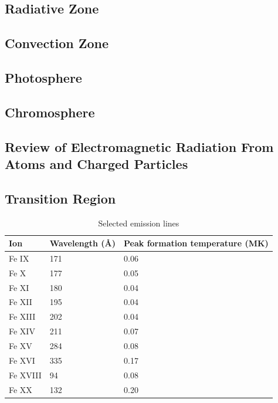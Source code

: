\subsection{Radiative Zone}

\subsection{Convection Zone}

\subsection{Photosphere}

\subsection{Chromosphere}

\subsection{Review of Electromagnetic Radiation From Atoms and Charged Particles}

\subsection{Transition Region}

\begin{table}[!h]
    \caption[Selected emission lines and temperatures]{
    Selected emission lines
    }
    \begin{center}
    \begin{tabular}{|l|l|p{2cm}|} \hline
	Ion & Wavelength (\AA) & Peak formation temperature (MK) \\ \hline \hline
	Fe IX & 171 & 0.06 \\ \hline
	Fe X & 177 & 0.05  \\ \hline
	Fe XI & 180 & 0.04 \\ \hline
	Fe XII & 195 & 0.04 \\ \hline
	Fe XIII & 202 & 0.04 \\ \hline
	Fe XIV & 211 & 0.07 \\ \hline
	Fe XV & 284 & 0.08 \\ \hline
	Fe XVI & 335 & 0.17 \\ \hline
	Fe XVIII & 94 & 0.08 \\ \hline
	Fe XX & 132 & 0.20 \\ \hline
	\end{tabular}
    \\ \rule{0mm}{5mm}
    \end{center}
    \label{tab:emissionlines}
\end{table}

